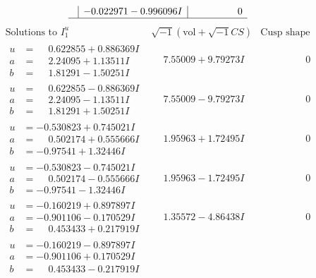 \documentclass[1p]{elsarticle_modified}
\theoremstyle{definition}
\newcommand{\I}{\sqrt{-1}}
\begin{document}
$$\begin{array}{c|c|c}
 & -0.022971 - 0.996096 I & \phantom{-0.000000 } 0\\
 \hline 
 \end{array}$$\newpage$$\begin{array}{c|c|c}  
\text{Solutions to }I^u_{1}& \I (\text{vol} + \sqrt{-1}CS) & \text{Cusp shape}\\
 \hline 
\begin{aligned}
u &= \phantom{-}0.622855 + 0.886369 I \\
a &= \phantom{-}2.24095 + 1.13511 I \\
b &= \phantom{-}1.81291 - 1.50251 I\end{aligned}
 & \phantom{-}7.55009 + 9.79273 I & \phantom{-0.000000 } 0 \\ \hline\begin{aligned}
u &= \phantom{-}0.622855 - 0.886369 I \\
a &= \phantom{-}2.24095 - 1.13511 I \\
b &= \phantom{-}1.81291 + 1.50251 I\end{aligned}
 & \phantom{-}7.55009 - 9.79273 I & \phantom{-0.000000 } 0 \\ \hline\begin{aligned}
u &= -0.530823 + 0.745021 I \\
a &= \phantom{-}0.502174 + 0.555666 I \\
b &= -0.97541 + 1.32446 I\end{aligned}
 & \phantom{-}1.95963 + 1.72495 I & \phantom{-0.000000 } 0 \\ \hline\begin{aligned}
u &= -0.530823 - 0.745021 I \\
a &= \phantom{-}0.502174 - 0.555666 I \\
b &= -0.97541 - 1.32446 I\end{aligned}
 & \phantom{-}1.95963 - 1.72495 I & \phantom{-0.000000 } 0 \\ \hline\begin{aligned}
u &= -0.160219 + 0.897897 I \\
a &= -0.901106 - 0.170529 I \\
b &= \phantom{-}0.453433 + 0.217919 I\end{aligned}
 & \phantom{-}1.35572 - 4.86438 I & \phantom{-0.000000 } 0 \\ \hline\begin{aligned}
u &= -0.160219 - 0.897897 I \\
a &= -0.901106 + 0.170529 I \\
b &= \phantom{-}0.453433 - 0.217919 I\end{aligned}

\end{array}$$
\end{document}
